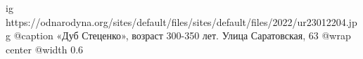  
 
 
 
 

\ifcmt
  ig https://odnarodyna.org/sites/default/files/sites/default/files/2022/ur23012204.jpg
  @caption «Дуб Стеценко», возраст 300-350 лет. Улица Саратовская, 63
	@wrap center
	@width 0.6
\fi
